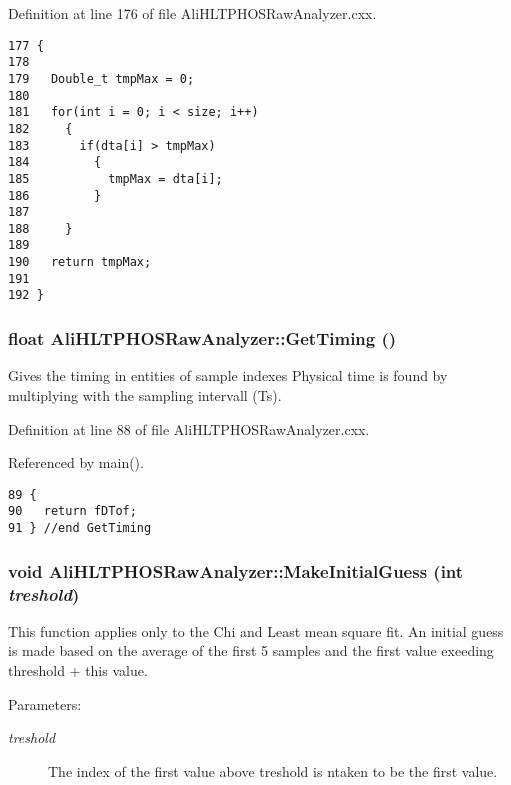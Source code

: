Definition at line 176 of file Ali\-HLTPHOSRaw\-Analyzer.cxx.

\footnotesize\begin{verbatim}177 {
178 
179   Double_t tmpMax = 0;
180 
181   for(int i = 0; i < size; i++)
182     {
183       if(dta[i] > tmpMax)
184         {
185           tmpMax = dta[i];
186         }
187 
188     }
189   
190   return tmpMax;
191 
192 }
\end{verbatim}\normalsize 


\subsubsection{\setlength{\rightskip}{0pt plus 5cm}float Ali\-HLTPHOSRaw\-Analyzer::Get\-Timing ()}\label{classAliHLTPHOSRawAnalyzer_AliHLTPHOSRawAnalyzerPeakFindera10}


Gives the timing in entities of sample indexes Physical time is found by multiplying with the sampling intervall (Ts). 

Definition at line 88 of file Ali\-HLTPHOSRaw\-Analyzer.cxx.

Referenced by main().

\footnotesize\begin{verbatim}89 {
90   return fDTof;
91 } //end GetTiming
\end{verbatim}\normalsize 


\subsubsection{\setlength{\rightskip}{0pt plus 5cm}void Ali\-HLTPHOSRaw\-Analyzer::Make\-Initial\-Guess (int {\em treshold})}\label{classAliHLTPHOSRawAnalyzer_AliHLTPHOSRawAnalyzerPeakFindera16}


This function applies only to the Chi and Least mean square fit. An initial guess is made based on the average of the first 5 samples and the first value exeeding threshold + this value. \begin{Desc}
\item[Parameters:]
\begin{description}
\item[{\em treshold}]The index of the first value above treshold is ntaken to be the first value. \end{description}
\end{Desc}


